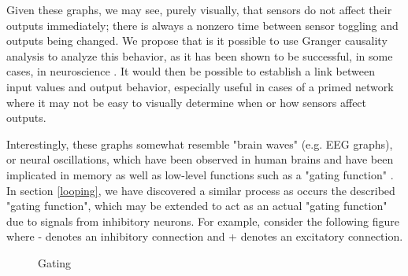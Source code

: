 \documentclass[12pt]{article}
\begin{document}
Given these graphs, we may see, purely visually, that sensors do not affect their outputs immediately; there is always a nonzero time between sensor toggling and outputs being changed.  We propose that is it possible to use Granger causality analysis to analyze this behavior, as it has been shown to be successful, in some cases, in neuroscience \cite{neurocausality, netcausality}.  It would then be possible to establish a link between input values and output behavior, especially useful in cases of a primed network where it may not be easy to visually determine when or how sensors affect outputs.

Interestingly, these graphs somewhat resemble "brain waves" (e.g. EEG graphs), or neural oscillations, which have been observed in human brains and have been implicated in memory \cite{oscillationmemory} as well as low-level functions such as a "gating function" \cite{oscillations}.  In section \ref{looping}, we have discovered a similar process as occurs the described "gating function", which may be extended to act as an actual "gating function" due to signals from inhibitory neurons.  For example, consider the following figure where - denotes an inhibitory connection and + denotes an excitatory connection.

\begin{figure}[H]
    \centering
    \caption{Gating} \label{fig:Gating}
\end{figure}
\end{document}
